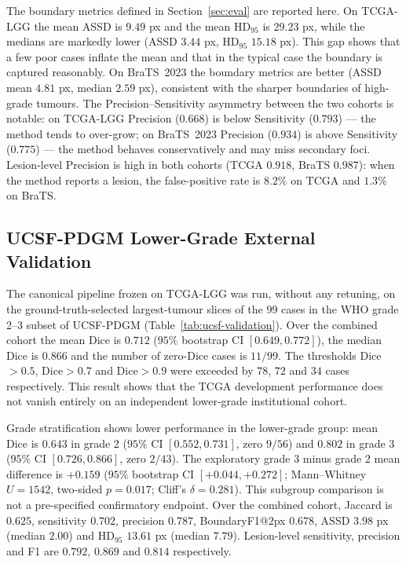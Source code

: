 \documentclass[11pt,a4paper]{article}
\begin{document}
The boundary metrics defined in Section~\ref{sec:eval} are reported here. On
TCGA-LGG the mean ASSD is $9.49$ px and the mean HD$_{95}$ is $29.23$ px, while
the medians are markedly lower (ASSD $3.44$ px, HD$_{95}$ $15.18$ px). This gap
shows that a few poor cases inflate the mean and that in the typical case the
boundary is captured reasonably. On BraTS~2023 the boundary metrics are better
(ASSD mean $4.81$ px, median $2.59$ px), consistent with the sharper boundaries of
high-grade tumours. The Precision--Sensitivity asymmetry between the two cohorts is
notable: on TCGA-LGG Precision ($0.668$) is below Sensitivity ($0.793$) --- the
method tends to over-grow; on BraTS~2023 Precision ($0.934$) is above Sensitivity
($0.775$) --- the method behaves conservatively and may miss secondary foci.
Lesion-level Precision is high in both cohorts (TCGA $0.918$, BraTS $0.987$): when
the method reports a lesion, the false-positive rate is $8.2\%$ on TCGA and $1.3\%$
on BraTS.

\subsection{UCSF-PDGM Lower-Grade External Validation}\label{sec:ucsf-validation}

The canonical pipeline frozen on TCGA-LGG was run, without any retuning, on the
ground-truth-selected largest-tumour slices of the $99$ cases in the WHO grade
2--3 subset of UCSF-PDGM (Table~\ref{tab:ucsf-validation}). Over the combined
cohort the mean Dice is $0.712$ ($95\%$ bootstrap CI $[0.649,0.772]$), the median
Dice is $0.866$ and the number of zero-Dice cases is $11/99$. The thresholds
Dice$>0.5$, Dice$>0.7$ and Dice$>0.9$ were exceeded by $78$, $72$ and $34$ cases
respectively. This result shows that the TCGA development performance does not
vanish entirely on an independent lower-grade institutional cohort.

Grade stratification shows lower performance in the lower-grade group: mean Dice
is $0.643$ in grade 2 ($95\%$ CI $[0.552,0.731]$, zero $9/56$) and $0.802$ in
grade 3 ($95\%$ CI $[0.726,0.866]$, zero $2/43$). The exploratory grade 3 minus
grade 2 mean difference is $+0.159$ ($95\%$ bootstrap CI $[+0.044,+0.272]$;
Mann--Whitney $U{=}1542$, two-sided $p{=}0.017$; Cliff's $\delta{=}0.281$). This
subgroup comparison is not a pre-specified confirmatory endpoint. Over the
combined cohort, Jaccard is $0.625$, sensitivity $0.702$, precision $0.787$,
BoundaryF1@$2$px $0.678$, ASSD $3.98$ px (median $2.00$) and HD$_{95}$ $13.61$ px
(median $7.79$). Lesion-level sensitivity, precision and F1 are $0.792$, $0.869$
and $0.814$ respectively.
\end{document}
